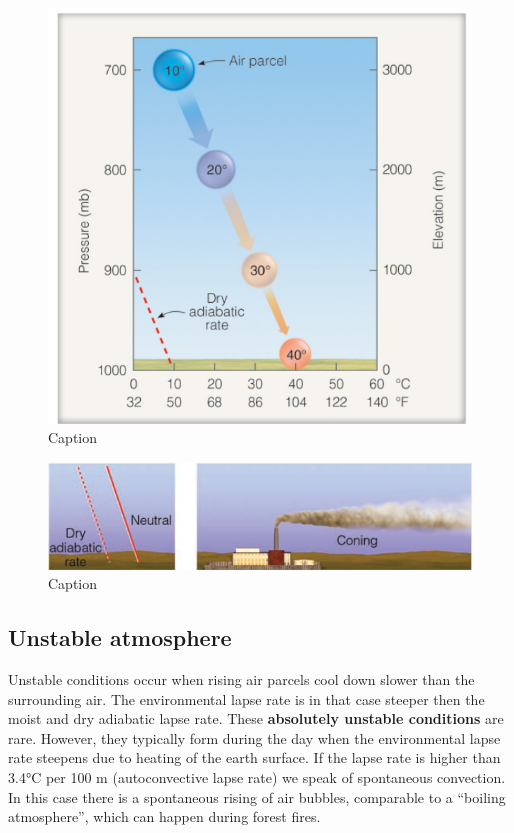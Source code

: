 \documentclass[12pt,oneside]{book}
\begin{document}
\begin{figure}

{\centering \includegraphics[width=0.9\linewidth]{figures/Figure37} 

}

\caption{Caption}\label{fig:Dadiabatic}
\end{figure}

\begin{figure}

{\centering \includegraphics[width=1\linewidth]{figures/Figure38} 

}

\caption{Caption}\label{fig:coning}
\end{figure}

\subsection{Unstable atmosphere}\label{unstable-atmosphere}

Unstable conditions occur when rising air parcels cool down slower than
the surrounding air. The environmental lapse rate is in that case
steeper then the moist and dry adiabatic lapse rate. These
\textbf{absolutely unstable conditions} are rare. However, they
typically form during the day when the environmental lapse rate steepens
due to heating of the earth surface. If the lapse rate is higher than
3.4°C per 100 m (autoconvective lapse rate) we speak of spontaneous
convection. In this case there is a spontaneous rising of air bubbles,
comparable to a ``boiling atmosphere'', which can happen during forest
fires.
\end{document}
